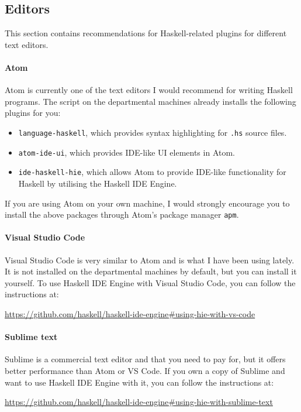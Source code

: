 \subsection{Editors}

This section contains recommendations for Haskell-related plugins for different text editors.

\paragraph{Atom} Atom is currently one of the text editors I would recommend for writing Haskell programs. The  script on the departmental machines already installs the following plugins for you:
\begin{itemize}
	\item \texttt{\small language-haskell}, which provides syntax highlighting for \texttt{\small .hs} source files.
	\item \texttt{\small atom-ide-ui}, which provides IDE-like UI elements in Atom.
	\item \texttt{\small ide-haskell-hie}, which allows Atom to provide IDE-like functionality for Haskell by utilising the Haskell IDE Engine. 
\end{itemize}
If you are using Atom on your own machine, I would strongly encourage you to install the above packages through Atom's package manager \texttt{\small apm}.

\paragraph{Visual Studio Code} Visual Studio Code is very similar to Atom and is what I have been using lately. It is not installed on the departmental machines by default, but you can install it yourself. To use Haskell IDE Engine with Visual Studio Code, you can follow the instructions at:
\begin{center}\small
	\parbox{13cm}{\centering\url{https://github.com/haskell/haskell-ide-engine\#using-hie-with-vs-code}}
\end{center}

\paragraph{Sublime text} Sublime is a commercial text editor and that you need to pay for, but it offers better performance than Atom or VS Code. If you own a copy of Sublime and want to use Haskell IDE Engine with it, you can follow the instructions at:
\begin{center}\small 
	\url{https://github.com/haskell/haskell-ide-engine#using-hie-with-sublime-text}
\end{center}

